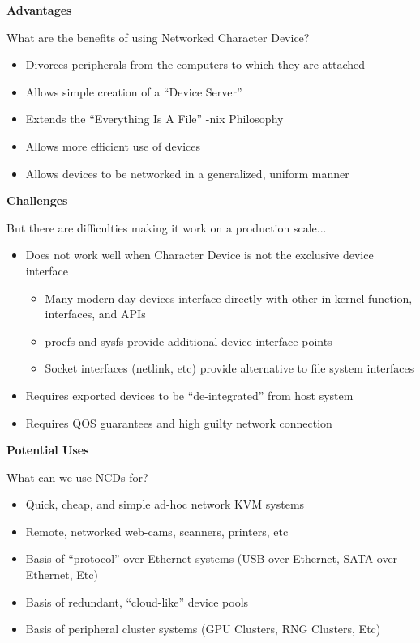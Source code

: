\documentclass[handout]{beamer}
\begin{document}
\begin{frame}{\bf Advantages}

What are the benefits of using Networked Character Device?

\begin{itemize}
\item<1-> Divorces peripherals from the computers to which they are
  attached
\item<2-> Allows simple creation of a ``Device Server''
\item<3-> Extends the ``Everything Is A File'' -nix Philosophy
\item<4-> Allows more efficient use of devices
\item<5-> Allows devices to be networked in a generalized, uniform manner
\end{itemize}

\end{frame}

\begin{frame}{\bf Challenges}

But there are difficulties making it work on a production scale...

\begin{itemize}
\item<1-> Does not work well when Character Device is not the exclusive
  device interface
  \begin{itemize}
  \item Many modern day devices interface directly with other
    in-kernel function, interfaces, and APIs
  \item procfs and sysfs provide additional device interface points
  \item Socket interfaces (netlink, etc) provide alternative to file
    system interfaces
  \end{itemize}
\item<2-> Requires exported devices to be ``de-integrated'' from host system
\item<3-> Requires QOS guarantees and high guilty network connection
\end{itemize}

\end{frame}

\begin{frame}{\bf Potential Uses}

What can we use NCDs for?

\begin{itemize}
\item<1-> Quick, cheap, and simple ad-hoc network KVM systems
\item<2-> Remote, networked web-cams, scanners, printers, etc
\item<3-> Basis of ``protocol''-over-Ethernet systems (USB-over-Ethernet,
  SATA-over-Ethernet, Etc)
\item<4-> Basis of redundant, ``cloud-like'' device pools
\item<5-> Basis of peripheral cluster systems (GPU Clusters, RNG Clusters,
  Etc)
\end{itemize}

\end{frame}
\end{document}
